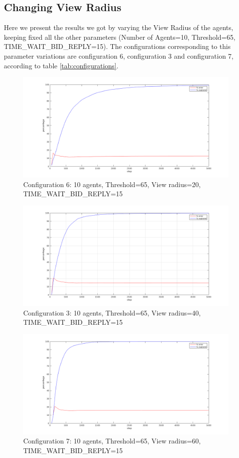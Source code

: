 \documentclass[a4paper, 10pt, conference]{ieeeconf}      %
\begin{document}
\subsection{Changing View Radius}
Here we present the results we got by varying the View Radius of the agents, keeping fixed all the other parameters (Number of Agents=10, Threshold=65, TIME\_WAIT\_BID\_REPLY=15). The configurations corresponding to this parameter variations are configuration 6, configuration 3 and configuration 7, according to table \ref{tab:configurations}.  
\begin{figure}[H]
	\centering
	\includegraphics[width=1\linewidth]{img/config6.png}
	\caption{Configuration 6: 10 agents, Threshold=65, View radius=20, TIME\_WAIT\_BID\_REPLY=15}
	\label{fig:config6}
\end{figure}
\begin{figure}[H]
	\centering
	\includegraphics[width=1\linewidth]{img/config3.png}
	\caption{Configuration 3: 10 agents, Threshold=65, View radius=40, TIME\_WAIT\_BID\_REPLY=15}
	\label{fig:config3}
\end{figure}
\begin{figure}[H]
	\centering
	\includegraphics[width=1\linewidth]{img/config7.png}
	\caption{Configuration 7: 10 agents, Threshold=65, View radius=60, TIME\_WAIT\_BID\_REPLY=15}
	\label{fig:config7}
\end{figure}
\end{document}
